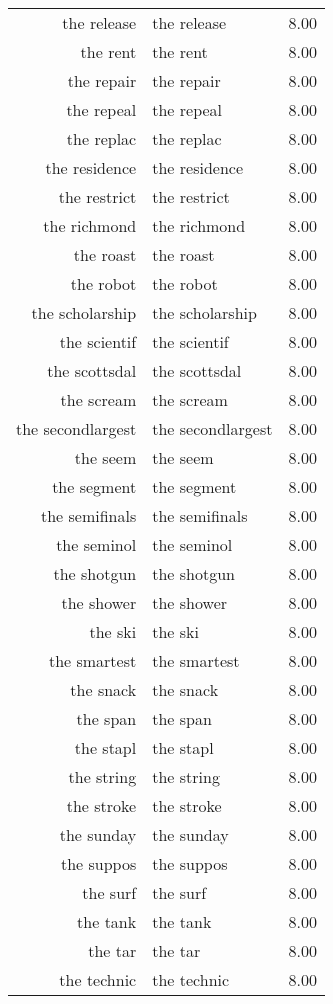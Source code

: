 \begin{table}[ht]
\begin{tabular}{rlr}
  the release & the release & 8.00 \\ 
  the rent & the rent & 8.00 \\ 
  the repair & the repair & 8.00 \\ 
  the repeal & the repeal & 8.00 \\ 
  the replac & the replac & 8.00 \\ 
  the residence & the residence & 8.00 \\ 
  the restrict & the restrict & 8.00 \\ 
  the richmond & the richmond & 8.00 \\ 
  the roast & the roast & 8.00 \\ 
  the robot & the robot & 8.00 \\ 
  the scholarship & the scholarship & 8.00 \\ 
  the scientif & the scientif & 8.00 \\ 
  the scottsdal & the scottsdal & 8.00 \\ 
  the scream & the scream & 8.00 \\ 
  the secondlargest & the secondlargest & 8.00 \\ 
  the seem & the seem & 8.00 \\ 
  the segment & the segment & 8.00 \\ 
  the semifinals & the semifinals & 8.00 \\ 
  the seminol & the seminol & 8.00 \\ 
  the shotgun & the shotgun & 8.00 \\ 
  the shower & the shower & 8.00 \\ 
  the ski & the ski & 8.00 \\ 
  the smartest & the smartest & 8.00 \\ 
  the snack & the snack & 8.00 \\ 
  the span & the span & 8.00 \\ 
  the stapl & the stapl & 8.00 \\ 
  the string & the string & 8.00 \\ 
  the stroke & the stroke & 8.00 \\ 
  the sunday & the sunday & 8.00 \\ 
  the suppos & the suppos & 8.00 \\ 
  the surf & the surf & 8.00 \\ 
  the tank & the tank & 8.00 \\ 
  the tar & the tar & 8.00 \\ 
  the technic & the technic & 8.00 \\ 

\end{tabular}
\end{table}
